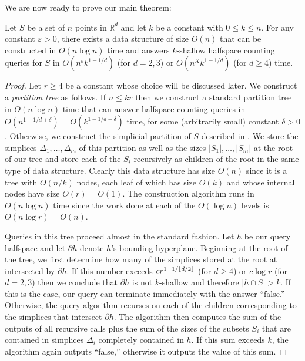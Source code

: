 \documentclass[lotsofwhite]{patmorin}
\newcommand{\eps}{\varepsilon}
\begin{document}
We are now ready to prove our main theorem:

\begin{thm}
Let $S$ be a set of $n$ points in $\mathbb{R}^d$ and let $k$ be a
constant with $0\le k\le n$.  For any constant $\eps>0$, there exists
a data structure of size $O(n)$ that can be constructed in $O(n\log
n)$ time and answers $k$-shallow halfspace
counting queries for $S$ in $O(n^\eps k^{1-1/d})$ (for $d=2,3$)
or $O(n^X k^{1-1/d})$ (for $d\ge 4$) time.
\end{thm}

\begin{proof}

Let $r\ge 4$ be a constant whose choice will be discussed later.  We
construct a \emph{partition tree} \cite{X} as follows.  If $n\le kr$
then we construct a standard partition tree in $O(n\log n)$ time that
can answer halfspace counting queries in
$O(n^{1-1/d+\delta})=O(k^{1-1/d+\delta})$ time, for some (arbitrarily
small) constant $\delta>0$.  Otherwise, we construct the simplicial
partition of $S$ described in .  We store
the simplices $\Delta_1,\ldots,\Delta_m$ of this partition as well as
the sizes $|S_1|,\ldots,|S_m|$ at the root of our tree and store each
of the $S_i$ recursively as children of the root in the same type of
data structure. Clearly this data structure has size $O(n)$ since it
is a tree with $O(n/k)$ nodes, each leaf of which has size $O(k)$ and
whose internal nodes have size $O(r)=O(1)$.  The construction
algorithm runs in $O(n\log n)$ time since the work done at each of the
$O(\log n)$ levels is $O(n\log r)=O(n)$. 

Queries in this tree proceed almost in the standard fashion. Let $h$
be our query halfspace and let $\partial h$ denote $h$'s bounding
hyperplane.  Beginning at the root of the tree, we first determine how
many of the simplices stored at the root at intersected by $\partial
h$.  If this number exceeds $cr^{1-1/\left\lfloor d/2 \right\rfloor}$ (for $d\ge 4$) or $c\log r$
(for $d=2,3$) then we conclude that $\partial h$ is not $k$-shallow
and therefore $|h\cap S|>k$.  If this is the case, our query can
terminate immediately with the answer ``false.''  Otherwise, the
query algorithm recurses on each of the children corresponding to the
simplices that intersect $\partial h$.  The algorithm then computes
the sum of the outputs of all recursive calls plus the sum of the
sizes of the subsets $S_i$ that are contained in simplices $\Delta_i$
completely contained in $h$.  If this sum exceeds $k$, the algorithm
again outputs ``false,'' otherwise it outputs the value of this sum.


\end{proof}
\end{document}
